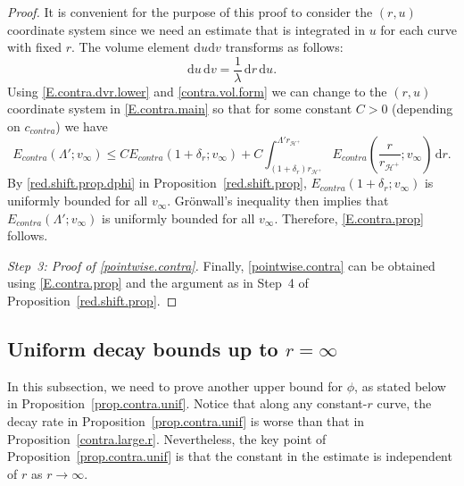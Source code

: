 \documentclass[10pt, reqno]{amsart}
\theoremstyle{definition}
\theoremstyle{remark}
\theoremstyle{conjecture}
\numberwithin{equation}{section}
\newcommand{\ud}{\mathrm{d}}
\newcommand{\0}{\emptyset}
\newcommand{\calH}{\mathcal H}
\newcommand{\f}{\frac}
\newcommand{\de}{\delta}
\newcommand{\EH}{\calH^{+}}
\newcommand{\pfstep}[1]{\vspace{.5em} {\it \noindent #1.}}
\begin{document}
\begin{proof}
It is convenient for the purpose of this proof to consider the $(r,u)$ coordinate system since we need an estimate that is integrated in $u$ for each curve with fixed $r$. The volume element $\ud u \ud v$ transforms as follows:
\begin{equation}\label{contra.vol.form}
\ud u\, \ud v= \f{1}{\lambda} \, \ud r\, \ud u.
\end{equation}
Using \eqref{E.contra.dvr.lower} and \eqref{contra.vol.form} we can change to the $(r,u)$ coordinate system in \eqref{E.contra.main} so that for some constant $C>0$ (depending on $c_{contra}$) we have
\begin{equation*}
E_{contra}(\Lambda';v_\infty) \leq CE_{contra}(1+{\de_r};v_\infty)+C\int_{(1+{\de_r})r_{\EH}}^{\Lambda' r_{\EH}} E_{contra}\left( \f{r}{r_{\EH}};v_\infty \right) \, \ud r.
\end{equation*}
By \eqref{red.shift.prop.dphi} in Proposition~\ref{red.shift.prop}, $E_{contra}(1+{\de_r};v_\infty)$ is uniformly bounded for all $v_\infty$. Gr\"onwall's inequality then implies that $E_{contra}(\Lambda';v_\infty)$ is uniformly bounded for all $v_\infty$. Therefore, \eqref{E.contra.prop} follows.

\pfstep{Step~3: Proof of \eqref{pointwise.contra}} Finally, \eqref{pointwise.contra} can be obtained using \eqref{E.contra.prop} and the argument as in Step~4 of Proposition~\ref{red.shift.prop}. \qedhere
\end{proof}

\subsection{Uniform decay bounds up to $r=\infty$}\label{sec.contra.unif}

In this subsection, we need to prove another upper bound for $\phi$, as stated below in Proposition~\ref{prop.contra.unif}. Notice that along any constant-$r$ curve, the decay rate in Proposition~\ref{prop.contra.unif} is worse than that in Proposition~\ref{contra.large.r}. Nevertheless, the key point of Proposition~\ref{prop.contra.unif} is that the constant in the estimate is independent of $r$ as $r\to \infty$. 
\end{document}
